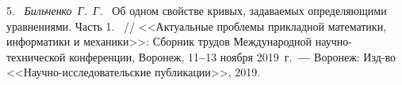 5.~%
\textit%
{Бильченко~Г.~Г.~}
{%
  {Об одном свойстве кривых,
  задаваемых
  определяющими уравнениями.
  Часть 1.}%
~/$\!$/
  <<Актуальные проблемы
  прикладной математики, информатики
  и механики>>:
  Сборник трудов Международной
  научно-тех\-ни\-чес\-кой
  конференции,
  Воронеж,
  11{\textbf{--}}13
  ноября 2019~г.~{\textbf{---}}
  Воронеж:
  Изд-во
  <<Научно-исследовательские
  публикации>>,
  2019.%
  }


